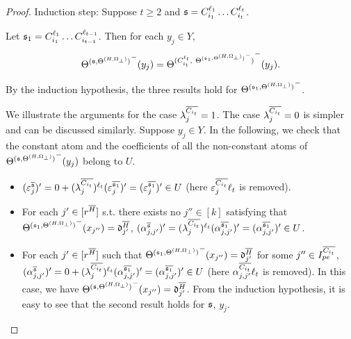 \begin{appendix}
{\begin{proof}
Induction step: Suppose $t \ge 2$ and ${\mathfrak{s} }=C^{\ell_1}_{i_1} \dots C^{\ell_t}_{i_t}$.

Let ${\mathfrak{s} }_1= C^{\ell_1}_{i_1} \dots C^{\ell_{t-1}}_{i_{t-1}}$.  Then for each $y_j \in Y$, 
\[{\Theta^{({\mathfrak{s} },\Theta^{(H,\Omega_\bot)})}}^-(y_j)=
{\Theta^{(C^{\ell_t}_{i_t},\ {\Theta^{({\mathfrak{s} }_1, \Theta^{(H,\Omega_\bot)})}}^-)}}^-(y_j).\] 

By the induction hypothesis, the three results hold for ${\Theta^{({\mathfrak{s} }_1, \Theta^{(H,\Omega_\bot)})}}^-$.

We illustrate the arguments for the case $\lambda^{\overline{C_{i_t}}}_{j} = 1$. The case $\lambda^{\overline{C_{i_t}}}_{j} = 0$ is simpler and can be discussed similarly. Suppose $y_j \in Y$.  In the following, we check that the constant atom and the coefficients of all the non-constant atoms of ${\Theta^{({\mathfrak{s} },\Theta^{(H,\Omega_\bot)})}}^-(y_j)$ belong to $U$.  
\begin{itemize}
	\item $(\varepsilon^{\overline{{\mathfrak{s} }}}_{j})' = 0 + (\lambda^{\overline{C_{i_t}}}_{j})^{\ell_t} (\varepsilon^{\overline{{\mathfrak{s} }_1}}_j)' = (\varepsilon^{\overline{{\mathfrak{s} }_1}}_j)' \in U$ (here $\varepsilon^{\overline{C_{i_t}}}_{j} \ell_t$ is removed).
	\item For each $j' \in [r^{\overline{H}}]$ s.t. there exists no $j'' \in [k]$ satisfying that ${\Theta^{({\mathfrak{s} }_1,\Theta^{(H,\Omega_\bot)})}}^-(x_{j''})=\mathfrak{d}^{\overline{H}}_{j'}$, $(\alpha^{\overline{{\mathfrak{s} }}}_{j, j'})' = (\lambda^{\overline{C_{i_t}}}_{j})^{\ell_t} (\alpha^{\overline{{\mathfrak{s} }_1}}_{j, j'})' = (\alpha^{\overline{{\mathfrak{s} }_1}}_{j, j'})' \in U$.
	\item For each $j' \in [r^{\overline{H}}]$ such that ${\Theta^{({\mathfrak{s} }_1,\Theta^{(H,\Omega_\bot)})}}^-(x_{j''})=\mathfrak{d}^{\overline{H}}_{j'}$ for some $j''  \in I^{\overline{C_{i_t}}}_{pe}$, $(\alpha^{\overline{{\mathfrak{s} }}}_{j, j'})' = 0 + (\lambda^{\overline{C_{i_t}}}_{j})^{\ell_t} (\alpha^{\overline{{\mathfrak{s} }_1}}_{j, j'})'= (\alpha^{\overline{{\mathfrak{s} }_1}}_{j, j'})' \in U$ (here $\alpha^{\overline{C_{i_t}}}_{j,j'} \ell_t$ is removed). In this case, we have ${\Theta^{({\mathfrak{s} },\Theta^{(H,\Omega_\bot)})}}^-(x_{j''})=\mathfrak{d}^{\overline{H}}_{j'}$. From the induction hypothesis, it is easy to see that the second result holds for ${\mathfrak{s} }$, $y_j$.

\end{itemize}
\end{proof}}
\end{appendix}
